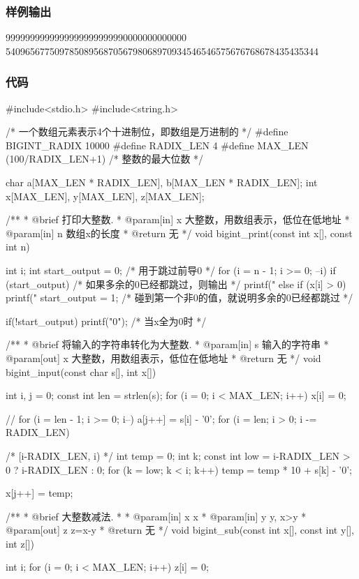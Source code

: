 \subsubsection{样例输出}
\begin{Code}
9999999999999999999999990000000000000
5409656775097850895687056798068970934546546575676768678435435344
\end{Code}

\subsubsection{代码}
\begin{Codex}[label=bigint_sub.c]
#include<stdio.h>
#include<string.h>

/* 一个数组元素表示4个十进制位，即数组是万进制的 */
#define BIGINT_RADIX 10000
#define RADIX_LEN 4
#define MAX_LEN (100/RADIX_LEN+1)  /* 整数的最大位数 */

char    a[MAX_LEN * RADIX_LEN], b[MAX_LEN * RADIX_LEN];
int     x[MAX_LEN], y[MAX_LEN], z[MAX_LEN];

/**
 * @brief 打印大整数.
 * @param[in] x 大整数，用数组表示，低位在低地址
 * @param[in] n 数组x的长度
 * @return 无
 */
void bigint_print(const int x[], const int n) {
    int i;
    int start_output = 0;  /* 用于跳过前导0 */
    for (i = n - 1; i >= 0; --i) {
        if (start_output) {  /* 如果多余的0已经都跳过，则输出 */
            printf("%
        } else if (x[i] > 0) {
            printf("%
            start_output = 1; /* 碰到第一个非0的值，就说明多余的0已经都跳过 */
        }
    }

    if(!start_output) printf("0");  /* 当x全为0时 */
}

/**
 * @brief 将输入的字符串转化为大整数.
 * @param[in] s 输入的字符串
 * @param[out] x 大整数，用数组表示，低位在低地址
 * @return 无
 */
void bigint_input(const char s[], int x[]) {
    int i, j = 0;
    const int len = strlen(s);
    for (i = 0; i < MAX_LEN; i++) x[i] = 0;

    // for (i = len - 1; i >= 0; i--) a[j++] = s[i] - '0';
    for (i = len; i > 0; i -= RADIX_LEN) {  /* [i-RADIX_LEN, i) */
        int temp = 0;
        int k;
        const int low = i-RADIX_LEN > 0 ? i-RADIX_LEN : 0;
        for (k = low; k < i; k++) {
            temp = temp * 10 + s[k] - '0';
        }

        x[j++] = temp;
    }
}

/**
 * @brief 大整数减法.
 *
 * @param[in] x x
 * @param[in] y y, x>y
 * @param[out] z z=x-y
 * @return 无
 */
void bigint_sub(const int x[], const int y[], int z[]) {
    int i;
    for (i = 0; i < MAX_LEN; i++) z[i] = 0;

}
\end{Codex}
